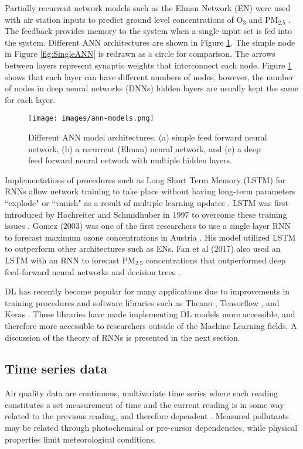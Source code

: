 Partially recurrent network models such as the Elman Network (EN) were used with air station inputs to predict ground level concentrations of O$_{3}$ \citep{Biancofiore2015} and PM$_{2.5}$ \citep{Biancofiore2017}. The feedback provides memory to the system when a single input set is fed into the system. Different ANN architectures are shown in Figure \ref{fig:ANNmodels}. The simple node in Figure \ref{fig:SingleANN} is redrawn as a circle for comparison.  The arrows between layers represent synaptic weights that interconnect each node. Figure \ref{fig:ANNmodels} shows that each layer can have different numbers of nodes, however, the number of nodes in deep neural networks (DNNs) hidden layers are usually kept the same for each layer.
%
\begin{figure}[H]
\centering
\texttt{[image: images/ann-models.png]} 
\caption[Different ANN model architectures.]{Different ANN model architectures. (a) simple feed forward neural network, (b) a recurrent (Elman) neural network, and (c) a deep feed forward neural network with multiple hidden layers.}
\label{fig:ANNmodels}
\end{figure}
%

Implementations of procedures such as Long Short Term Memory (LSTM) for RNNs allow network training to take place without having long-term parameters ``explode" or ``vanish" as a result of multiple learning updates \citep{Pascanu2013}. LSTM was first introduced by Hochreiter and Schmidhuber in 1997  to overcome these training issues \citep{Hochreiter1997}. Gomez (2003) was one of the first researchers to use a single layer RNN to forecast maximum ozone concentrations in Austria \citep{Gomez2003}. His model utilized LSTM to outperform other architectures such as ENs. Fan et al (2017) also used an LSTM with an RNN to forecast PM$_{2.5}$ concentrations that outperformed deep feed-forward neural networks and decision trees \citep{Fan2017}.  

DL has recently become popular for many applications due to improvements in training procedures and software libraries such as Theano \citep{Theano2016}, Tensorflow \citep{Tensorflow2015}, and Keras \citep{keras2015}. These libraries have made implementing DL models more accessible, and therefore more accessible to researchers outside of the Machine Learning fields. A discussion of the theory of RNNs is presented in the next section.

\subsection{Time series data}
Air quality data are continuous, multivariate time series where each reading constitutes a set measurement of time and the current reading is in some way related to the previous reading, and therefore dependent \citep{Gheyas2011}. Measured pollutants may be related through photochemical or pre-cursor dependencies, while physical properties limit meteorological conditions. 

